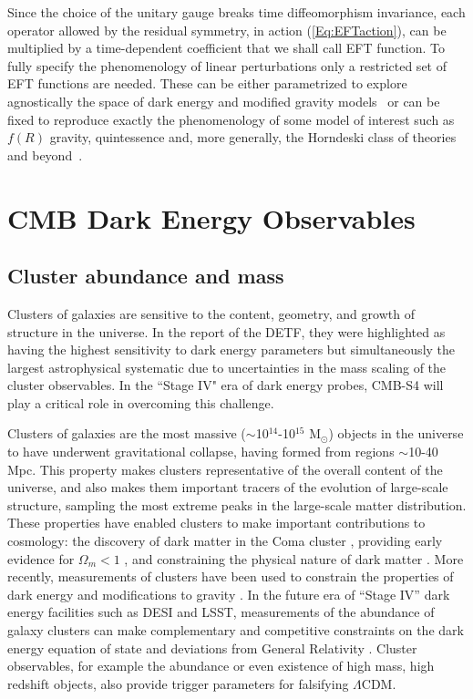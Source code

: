 Since the choice of the unitary gauge breaks time diffeomorphism invariance, each operator allowed by the residual symmetry, in action (\ref{Eq:EFTaction}), can be multiplied by a time-dependent coefficient that we shall call EFT function. To fully specify the phenomenology of linear perturbations only a restricted set of EFT functions are needed. These can be either parametrized to explore agnostically the space of dark energy and modified gravity models~\cite{Gleyzes:2013ooa,Bloomfield:2013efa,Piazza:2013coa,Gleyzes:2014rba} or can be fixed to reproduce exactly the phenomenology of some model of interest such as $f(R)$ gravity, quintessence and, more generally, the Horndeski class of theories and beyond~\cite{Gleyzes:2014dya,Frusciante:2015maa,Frusciante:2016xoj}.
%


\section{CMB  Dark Energy Observables}

\subsection{Cluster abundance and mass}

Clusters of galaxies are sensitive to the content, geometry, and growth of structure in the universe.     In the report of the DETF, they were highlighted as having the highest sensitivity
to dark energy parameters  but simultaneously the largest astrophysical systematic due
to uncertainties in the mass scaling of the cluster observables.   In the ``Stage IV" era of
dark energy probes, CMB-S4 will play a critical role in overcoming this challenge.




Clusters of galaxies are the most massive ($\sim$10$^{14}$-10$^{15}$ M$_{\odot}$) objects in the universe to have underwent gravitational collapse, 
having formed from regions $\sim$10-40 Mpc.  This property makes clusters representative of the overall content of the universe, and also makes them 
important tracers of the evolution of large-scale structure, sampling the most extreme peaks in the large-scale matter distribution.  
These properties have enabled clusters to make important contributions to cosmology: the discovery of dark matter in the 
Coma cluster \cite{Zwicky:1933gu}, 
providing early evidence for $\Omega_m < 1$ \cite{White:1993wm, Donahue:1997sp, Bahcall:1998ur}, and
constraining the physical nature of dark matter \cite{Clowe:2006eq}.  
More recently, measurements of clusters have been used to constrain the properties of dark energy and modifications 
to gravity \cite{Vikhlinin:2008ym, Mantz:2009fw, Rapetti:2012bu, Benson:2011uta, Mantz:2014xba, Mantz:2014paa}.   In the future era of ``Stage IV'' dark energy 
facilities such as DESI and LSST, measurements of the abundance of galaxy clusters can make complementary and 
competitive constraints on the dark energy equation of state and deviations from General Relativity \cite{Weinberg:2012es}.   Cluster observables, for example the abundance or even existence of high mass, high redshift objects, also provide trigger parameters for falsifying $\Lambda$CDM.

